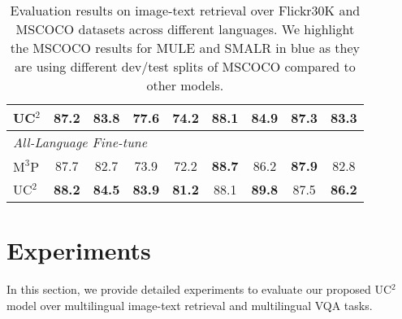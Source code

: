 \documentclass[final]{cvpr}
\newcommand{\jj}[1]{\textcolor{red}{\small{\bf [JJ: #1 ]}}}
\newcommand{\mingyang}[1]{\textcolor{brown}{\small{\bf [Mingyang: #1 ]}}}
\newcommand{\linjie}[1]{\textcolor{asparagus}{\small{\bf [Linjie: #1 ]}}}
\begin{document}
\begin{table*}[!]
\begin{tabular}{lcccccccc}
UC$^2$   &  87.2 &  83.8 &  77.6 &  74.2                                 & 88.1 &  84.9 & 87.3 & 83.3 \\
\hline
\multicolumn{9}{l}{\textit{All-Language Fine-tune}} \\
\hline
$\text{M}^3\text{P}$\cite{huang2020m3p}               & 87.7                                  & 82.7                                 & 73.9                               & 72.2                                 & \textbf{88.7}                                 & 86.2                              &  \textbf{87.9}                              & 82.8                                 \\ \hline
UC$^2$   &  \textbf{88.2} &  \textbf{84.5} &  \textbf{83.9} &  \textbf{81.2}                                 & 88.1 &  \textbf{89.8} & 87.5 & \textbf{86.2} \\ 
\hline
\end{tabular}
\caption{Evaluation results on image-text retrieval over Flickr30K and MSCOCO datasets across different languages. We highlight the MSCOCO results for MULE and SMALR in {\color[HTML]{0000FF}blue} as they are using different dev/test splits of MSCOCO compared to other models.} 
\label{tab:itm}
\vspace{-3mm}
\end{table*}

\section{Experiments}
In this section, 
we provide detailed experiments to evaluate our proposed UC$^2$ model over multilingual image-text retrieval and multilingual VQA tasks. %
\end{document}
